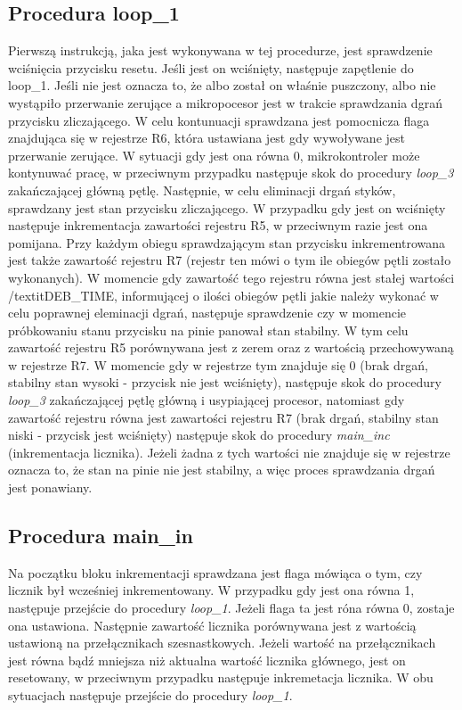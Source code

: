 \documentclass[fleqn]{article}
\begin{document}
\subsection{Procedura loop\_1}
		Pierwszą instrukcją, jaka jest wykonywana w tej procedurze, jest sprawdzenie wciśnięcia przycisku resetu. Jeśli jest on wciśnięty, następuje zapętlenie do loop\_1. Jeśli nie jest oznacza to, że albo został on właśnie puszczony, albo nie wystąpiło przerwanie zerujące a mikropocesor jest w trakcie sprawdzania dgrań przycisku zliczającego. W celu kontunuacji sprawdzana jest pomocnicza flaga znajdująca się w rejestrze R6, która ustawiana jest gdy wywoływane jest przerwanie zerujące. W sytuacji gdy jest ona równa 0, mikrokontroler może kontynuwać pracę, w przeciwnym przypadku następuje skok do procedury \textit{loop\_3} zakańczającej główną pętlę. Następnie, w celu eliminacji drgań styków, sprawdzany jest stan przycisku zliczającego. W przypadku gdy jest on wciśnięty następuje inkrementacja zawartości rejestru R5, w przeciwnym razie jest ona pomijana. Przy każdym obiegu sprawdzającym stan przycisku inkrementrowana jest także zawartość rejestru R7 (rejestr ten mówi o tym ile obiegów pętli zostało wykonanych). W momencie gdy zawartość tego rejestru równa jest stałej wartości /textit{DEB\_TIME}, informującej o ilości obiegów pętli jakie należy wykonać w celu poprawnej eleminacji dgrań, następuje sprawdzenie czy w momencie próbkowaniu stanu przycisku na pinie panował stan stabilny. W tym celu zawartość rejestru R5 porównywana jest z zerem oraz z wartością przechowywaną w rejestrze R7. W momencie gdy w rejestrze tym znajduje się 0 (brak drgań, stabilny stan wysoki - przycisk nie jest wciśnięty), następuje skok do procedury \textit{loop\_3} zakańczającej pętlę główną i usypiającej procesor, natomiast gdy zawartość rejestru równa jest zawartości rejestru R7 (brak drgań, stabilny stan niski - przycisk jest wciśnięty) następuje skok do procedury \textit{main\_inc} (inkrementacja licznika). Jeżeli żadna z tych wartości nie znajduje się w rejestrze oznacza to, że stan na pinie nie jest stabilny, a więc proces sprawdzania drgań jest ponawiany.

\subsection{Procedura main\_in}
		Na początku bloku inkrementacji sprawdzana jest flaga mówiąca o tym, czy licznik był wcześniej inkrementowany. W przypadku gdy jest ona równa 1, następuje przejście do procedury \textit{loop\_1}. Jeżeli flaga ta jest róna równa 0, zostaje ona ustawiona. Następnie zawartość licznika porównywana jest z wartością ustawioną na przełącznikach szesnastkowych. Jeżeli wartość na przełącznikach jest równa bądź mniejsza niż aktualna wartość licznika głównego, jest on resetowany, w przeciwnym przypadku następuje inkremetacja licznika. W obu sytuacjach następuje przejście do procedury \textit{loop\_1}.
\end{document}
